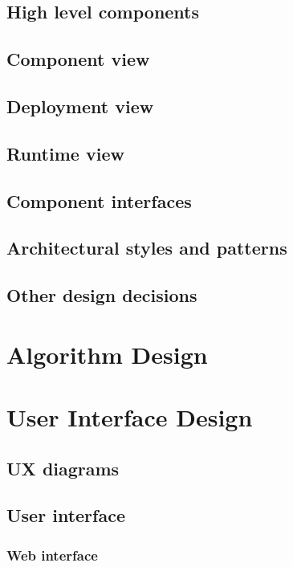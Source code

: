 \documentclass{article}
\begin{document}
	\subsection{High level components}


	\subsection{Component view}


	\subsection{Deployment view}


	\subsection{Runtime view}


	\subsection{Component interfaces}
	
	
	\subsection{Architectural styles and patterns}


	\subsection{Other design decisions}


	\section{Algorithm Design}


	\section{User Interface Design}


	\subsection{UX diagrams}


	\subsection{User interface}


	\subsubsection{Web interface}
\end{document}

